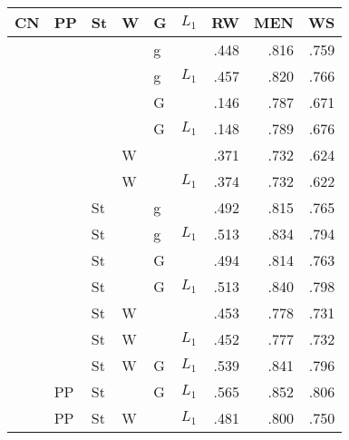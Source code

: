 \documentclass[11pt,letterpaper]{article}
\begin{document}
\begin{table}[ht]
\centering
\footnotesize
\begin{tabular}{llllllrrr}
\toprule
\bf CN&\bf PP&\bf St&\bf W& \bf G& $L_1$  & \bf RW  & \bf MEN & \bf  WS \\
\midrule
     &      &      &      & g    &        &    .448 &    .816 &    .759 \\  %
     &      &      &      & g    & $L_1$  &    .457 &    .820 &    .766 \\  %
     &      &      &      & G    &        &    .146 &    .787 &    .671 \\  %
     &      &      &      & G    & $L_1$  &    .148 &    .789 &    .676 \\  %
     &      &      & W    &      &        &    .371 &    .732 &    .624 \\  %
     &      &      & W    &      & $L_1$  &    .374 &    .732 &    .622 \\  %
     &      & St   &      & g    &        &    .492 &    .815 &    .765 \\  %
     &      & St   &      & g    & $L_1$  &    .513 &    .834 &    .794 \\  %
     &      & St   &      & G    &        &    .494 &    .814 &    .763 \\  %
     &      & St   &      & G    & $L_1$  &    .513 &    .840 &    .798 \\  %
     &      & St   & W    &      &        &    .453 &    .778 &    .731 \\  %
     &      & St   & W    &      & $L_1$  &    .452 &    .777 &    .732 \\  %
     &      & St   & W    & G    & $L_1$  &    .539 &    .841 &    .796 \\  %
     & PP   & St   &      & G    & $L_1$  &    .565 &    .852 &    .806 \\  %
     & PP   & St   & W    &      & $L_1$  &    .481 &    .800 &    .750 \\  %

\end{tabular}
\end{table}
\end{document}
